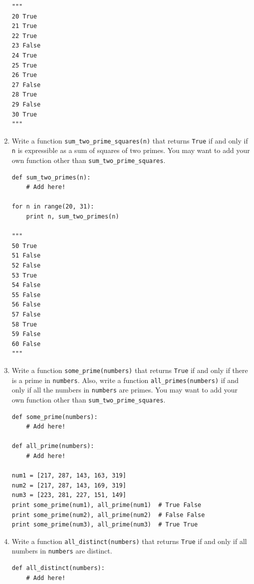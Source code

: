 \documentclass[../main.tex]{subfiles}
\begin{document}
\begin{enumerate}
\begin{verbatim}
"""
20 True
21 True
22 True
23 False
24 True
25 True
26 True
27 False
28 True
29 False
30 True
"""
\end{verbatim}

\item Write a function \texttt{sum\_two\_prime\_squares(n)} that returns \texttt{True} if and only if \texttt{n} is expressible as a sum of squares of two primes.
You may want to add your own function other than \texttt{sum\_two\_prime\_squares}.
\begin{verbatim}
def sum_two_primes(n):
    # Add here!
    
for n in range(20, 31):
    print n, sum_two_primes(n)

"""
50 True
51 False
52 False
53 True
54 False
55 False
56 False
57 False
58 True
59 False
60 False
"""
\end{verbatim}

\item Write a function \texttt{some\_prime(numbers)} that returns \texttt{True} if and only if there is a prime in \texttt{numbers}.
Also, write a function \texttt{all\_primes(numbers)} if and only if all the numbers in \texttt{numbers} are primes.
You may want to add your own function other than \texttt{sum\_two\_prime\_squares}.
\begin{verbatim}
def some_prime(numbers):
    # Add here!

def all_prime(numbers):
    # Add here!
               
num1 = [217, 287, 143, 163, 319]
num2 = [217, 287, 143, 169, 319]
num3 = [223, 281, 227, 151, 149]
print some_prime(num1), all_prime(num1)  # True False
print some_prime(num2), all_prime(num2)  # False False
print some_prime(num3), all_prime(num3)  # True True
\end{verbatim}

\item Write a function \texttt{all\_distinct(numbers)} that returns \texttt{True} if and only if all numbers in \texttt{numbers} are distinct.
\begin{verbatim}
def all_distinct(numbers):
    # Add here!


\end{verbatim}
\end{enumerate}
\end{document}
